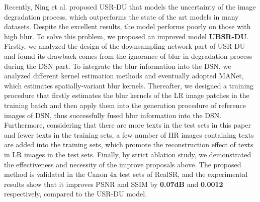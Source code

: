 Recently, Ning et al. proposed USR-DU that models the uncertainty of the image degradation process, which outperforms the state of the art models in many datasets. Despite the excellent results, the model performs poorly on those with high blur. To solve this problem, we proposed an improved model \textbf{UBSR-DU}. Firstly, we analyzed the design of the downsampling network part of USR-DU and found its drawback comes from the ignorance of blur in degradation process during the DSN part. To integrate the blur information into the DSN, we analyzed different kernel estimation methods and eventually adopted MANet, which estimates spatially-variant blur kernels. Thereafter, we designed a training procedure that firstly estimates the blur kernels of the LR image patches in the training batch and then apply them into the generation procedure of reference images of DSN, thus successfully fused blur information into the DSN. Furthermore, considering that there are more texts in the test sets in this paper and fewer texts in the training sets, a few number of HR images containing texts are added into the training sets, which promote the reconstruction effect of texts in LR images in the test sets. Finally, by strict ablation study, we demonstrated the effectiveness and necessity of the improve proposals above. The proposed method is validated in the Canon 4x test sets of RealSR, and the experimental results show that it improves PSNR and SSIM by \textbf{0.07dB} and \textbf{0.0012} respectively, compared to the USR-DU model.